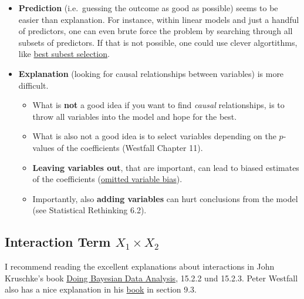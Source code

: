\documentclass[
]{book}
\providecommand{\tightlist}{%
  \setlength{\itemsep}{0pt}\setlength{\parskip}{0pt}}
\begin{document}
\begin{itemize}
\item
  \textbf{Prediction} (i.e.~guessing the outcome as good as possible) seems to be easier
  than explanation. For instance, within linear models and
  just a handful of predictors, one can even brute force the problem by searching through
  all subsets of predictors. If that is not possible, one could use clever algortithms, like
  \href{https://www.sthda.com/english/articles/37-model-selection-essentials-in-r/155-best-subsets-regression-essentials-in-r/}{best subest selection}.
\item
  \textbf{Explanation} (looking for causal relationships between variables) is more difficult.

  \begin{itemize}
  \tightlist
  \item
    What is \textbf{not} a good idea if you want to find \emph{causal} relationships,
    is to throw all variables into the model and hope for the best.
  \item
    What is also not a good idea is to select variables depending on the \(p\)-values of the coefficients (Westfall Chapter 11).
  \item
    \textbf{Leaving variables out}, that are important, can lead to biased estimates of the coefficients
    (\href{https://en.wikipedia.org/wiki/Omitted-variable_bias}{omitted variable bias}).
  \item
    Importantly, also \textbf{adding variables} can hurt conclusions from the model (see Statistical Rethinking 6.2).
  \end{itemize}
\end{itemize}

\subsection{\texorpdfstring{Interaction Term \(X_1 \times X_2\)}{Interaction Term X\_1 \textbackslash times X\_2}}\label{interaction_term}

I recommend reading the excellent explanations about interactions
in John Kruschke's book \href{https://nyu-cdsc.github.io/learningr/assets/kruschke_bayesian_in_R.pdf}{Doing Bayesian Data Analysis},
15.2.2 und 15.2.3. Peter Westfall also has a nice explanation in his \href{https://www.routledge.com/Understanding-Regression-Analysis-A-Conditional-Distribution-Approach/Westfall-Arias/p/book/9780367493516?srsltid=AfmBOore3O_Ciecl0TTkr9AjPIY1d6OmbQa7o7IAdKpTSkD8s9HkwzD4}{book}
in section 9.3.
\end{document}
